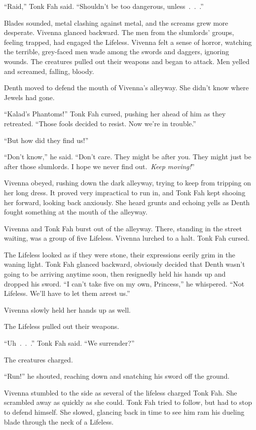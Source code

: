 “Raid,” Tonk Fah said. “Shouldn’t be too dangerous, unless~.~.~.”

Blades sounded, metal clashing against metal, and the screams grew more desperate. Vivenna glanced backward. The men from the slumlords’ groups, feeling trapped, had engaged the Lifeless. Vivenna felt a sense of horror, watching the terrible, grey-faced men wade among the swords and daggers, ignoring wounds. The creatures pulled out their weapons and began to attack. Men yelled and screamed, falling, bloody.

Denth moved to defend the mouth of Vivenna’s alleyway. She didn’t know where Jewels had gone.

“Kalad’s Phantoms!” Tonk Fah cursed, pushing her ahead of him as they retreated. “Those fools decided to resist. Now we’re in trouble.”

“But how did they find us!”

“Don’t know,” he said. “Don’t care. They might be after you. They might just be after those slumlords. I hope we never find out.~\textit{Keep moving!}”

Vivenna obeyed, rushing down the dark alleyway, trying to keep from tripping on her long dress. It proved very impractical to run in, and Tonk Fah kept shooing her forward, looking back anxiously. She heard grunts and echoing yells as Denth fought something at the mouth of the alleyway.

Vivenna and Tonk Fah burst out of the alleyway. There, standing in the street waiting, was a group of five Lifeless. Vivenna lurched to a halt. Tonk Fah cursed.

The Lifeless looked as if they were stone, their expressions eerily grim in the waning light. Tonk Fah glanced backward, obviously decided that Denth wasn’t going to be arriving anytime soon, then resignedly held his hands up and dropped his sword. “I can’t take five on my own, Princess,” he whispered. “Not Lifeless. We’ll have to let them arrest us.”

Vivenna slowly held her hands up as well.

The Lifeless pulled out their weapons.

“Uh~.~.~.” Tonk Fah said. “We surrender?”

The creatures charged.

“Run!” he shouted, reaching down and snatching his sword off the ground.

Vivenna stumbled to the side as several of the lifeless charged Tonk Fah. She scrambled away as quickly as she could. Tonk Fah tried to follow, but had to stop to defend himself. She slowed, glancing back in time to see him ram his dueling blade through the neck of a Lifeless.

